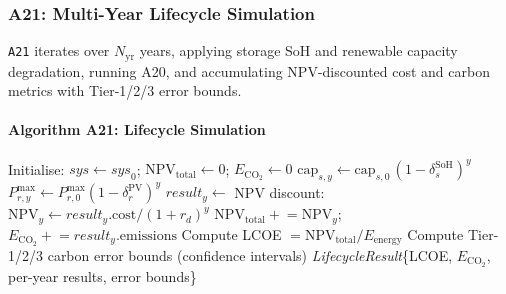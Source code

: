 \subsubsection{A21: Multi-Year Lifecycle Simulation}
\label{algo:a21}

\texttt{A21} iterates over $N_{\mathrm{yr}}$ years, applying storage SoH and
renewable capacity degradation, running A20, and accumulating NPV-discounted
cost and carbon metrics with Tier-1/2/3 error bounds.

\paragraph{Algorithm A21: Lifecycle Simulation}
\begin{algorithmic}[1]
  \State Initialise: $\mathit{sys} \gets \mathit{sys}_0$;
    $\mathrm{NPV}_\mathrm{total} \gets 0$;
    $E_\mathrm{CO_2} \gets 0$
      \State $\mathrm{cap}_{s,y} \gets \mathrm{cap}_{s,0}\,(1 - \delta_s^{\mathrm{SoH}})^y$
    \EndFor
      \State $P_{r,y}^{\max} \gets P_{r,0}^{\max}(1 - \delta_r^{\mathrm{PV}})^y$
    \EndFor
    \State $\mathit{result}_y \gets$ 
    \State NPV discount: $\mathrm{NPV}_y \gets \mathit{result}_y.\mathrm{cost}/(1+r_d)^y$
    \State $\mathrm{NPV}_\mathrm{total} \mathrel{+}= \mathrm{NPV}_y$;\quad
      $E_{\mathrm{CO_2}} \mathrel{+}= \mathit{result}_y.\mathrm{emissions}$
  \EndFor
  \State Compute LCOE $= \mathrm{NPV}_\mathrm{total} / E_\mathrm{energy}$
  \State Compute Tier-1/2/3 carbon error bounds (confidence intervals)
  \State \Return \textit{LifecycleResult}\{LCOE, $E_{\mathrm{CO_2}}$,
    per-year results, error bounds\}
\EndProcedure
\end{algorithmic}

